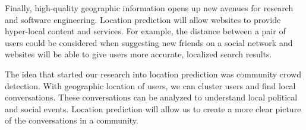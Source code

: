 \documentclass{sig-alternate}
\begin{document}
Finally, high-quality geographic information opens up new avenues for research
and software engineering.
%
Location prediction will allow websites to provide hyper-local content and
services.
%
For example, the distance between a pair of users could be considered when
suggesting new friends on a social network and websites will be able to give
users more accurate, localized search results.

The idea that started our research into location prediction was community crowd
detection.
%
With geographic location of users, we can cluster users and find local
conversations.
%
These conversations can be analyzed to understand local political and social
events.
%
Location prediction will allow us to create a more clear picture of the
conversations in a community.



%


\end{document}
